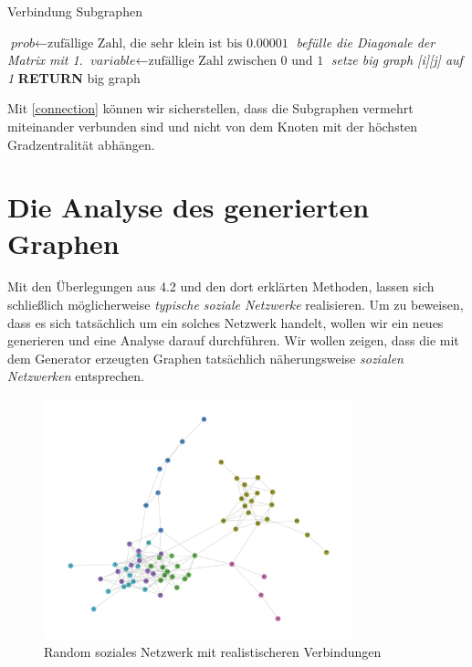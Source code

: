 \begin{algorithm}
\caption{Verbindung Subgraphen}\label{connection}
\begin{algorithmic}[1]
\State $\textit{prob} \gets \text{zufällige Zahl, die sehr klein ist bis 0.00001}$
\State \textit{befülle die Diagonale der Matrix mit 1}.
\EndFor
{}
\State $\textit{variable} \gets \text{zufällige Zahl zwischen 0 und 1}$
\State \textit{setze big graph [i][j] auf 1}
\EndIf
\EndFor
\EndFor
\textbf{RETURN} big graph
\EndProcedure
\end{algorithmic}
\end{algorithm}

Mit \ref{connection} können wir sicherstellen, dass die Subgraphen vermehrt miteinander verbunden sind und nicht von dem Knoten mit der höchsten Gradzentralität abhängen.

\section{Die Analyse des generierten Graphen}
Mit den Überlegungen aus 4.2 und den dort erklärten Methoden, lassen sich schließlich möglicherweise \textit{typische soziale Netzwerke} realisieren. Um zu beweisen, dass es sich tatsächlich um ein solches Netzwerk handelt, wollen wir ein neues generieren und eine Analyse darauf durchführen. Wir wollen zeigen, dass die mit dem Generator erzeugten Graphen tatsächlich näherungsweise \textit{sozialen Netzwerken} entsprechen.

\FloatBarrier
\begin{figure}[h!]
    \centering
    \hspace*{-2cm}
    \includegraphics[width=0.8\textwidth]{Graphics/Random_moreConnections.jpg}
    \caption{Random soziales Netzwerk mit realistischeren Verbindungen}
    \label{fig:SNA}
\end{figure}

